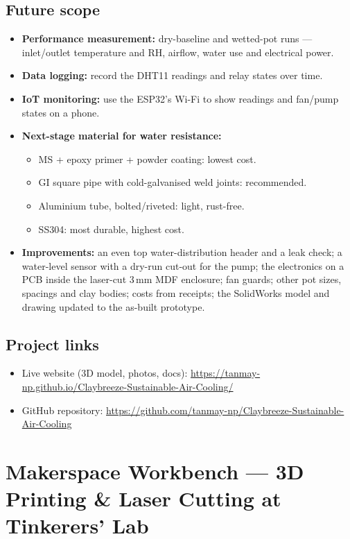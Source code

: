 \documentclass[11pt,a4paper]{report}
\begin{document}
\section{Future scope}
\label{sec:future}
\begin{itemize}
\item \textbf{Performance measurement:} dry-baseline and wetted-pot runs --- inlet/outlet temperature and RH, airflow, water use and electrical power.
\item \textbf{Data logging:} record the DHT11 readings and relay states over time.
\item \textbf{IoT monitoring:} use the ESP32's Wi-Fi to show readings and fan/pump states on a phone.
\item \textbf{Next-stage material for water resistance:}
\begin{itemize}
\item MS + epoxy primer + powder coating: lowest cost.
\item GI square pipe with cold-galvanised weld joints: recommended.
\item Aluminium tube, bolted/riveted: light, rust-free.
\item SS304: most durable, highest cost.
\end{itemize}
\item \textbf{Improvements:} an even top water-distribution header and a leak check; a water-level sensor with a dry-run cut-out for the pump; the electronics on a PCB inside the laser-cut 3\,mm MDF enclosure; fan guards; other pot sizes, spacings and clay bodies; costs from receipts; the SolidWorks model and drawing updated to the as-built prototype.
\end{itemize}

\section*{Project links}
\begin{itemize}
\item Live website (3D model, photos, docs): \url{https://tanmay-np.github.io/Claybreeze-Sustainable-Air-Cooling/}
\item GitHub repository: \url{https://github.com/tanmay-np/Claybreeze-Sustainable-Air-Cooling}
\end{itemize}

\chapter{Makerspace Workbench --- 3D Printing \& Laser Cutting at Tinkerers' Lab}
\label{ch:digifab}
\end{document}
